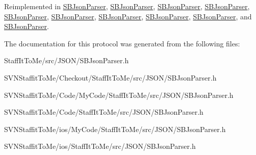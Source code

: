 \-Reimplemented in \hyperlink{interface_s_b_json_parser_a1ec40b986576044d58d30172b141c74c}{\-S\-B\-Json\-Parser}, \hyperlink{interface_s_b_json_parser_a1ec40b986576044d58d30172b141c74c}{\-S\-B\-Json\-Parser}, \hyperlink{interface_s_b_json_parser_a1ec40b986576044d58d30172b141c74c}{\-S\-B\-Json\-Parser}, \hyperlink{interface_s_b_json_parser_a1ec40b986576044d58d30172b141c74c}{\-S\-B\-Json\-Parser}, \hyperlink{interface_s_b_json_parser_a1ec40b986576044d58d30172b141c74c}{\-S\-B\-Json\-Parser}, \hyperlink{interface_s_b_json_parser_a1ec40b986576044d58d30172b141c74c}{\-S\-B\-Json\-Parser}, \hyperlink{interface_s_b_json_parser_a1ec40b986576044d58d30172b141c74c}{\-S\-B\-Json\-Parser}, \hyperlink{interface_s_b_json_parser_a1ec40b986576044d58d30172b141c74c}{\-S\-B\-Json\-Parser}, \hyperlink{interface_s_b_json_parser_a1ec40b986576044d58d30172b141c74c}{\-S\-B\-Json\-Parser}, and \hyperlink{interface_s_b_json_parser_a1ec40b986576044d58d30172b141c74c}{\-S\-B\-Json\-Parser}.



\-The documentation for this protocol was generated from the following files\-:\begin{DoxyCompactItemize}
\item 
\-Staff\-It\-To\-Me/src/\-J\-S\-O\-N/\-S\-B\-Json\-Parser.\-h\item 
\-S\-V\-N\-Staffit\-To\-Me/\-Checkout/\-Staff\-It\-To\-Me/src/\-J\-S\-O\-N/\-S\-B\-Json\-Parser.\-h\item 
\-S\-V\-N\-Staffit\-To\-Me/\-Code/\-My\-Code/\-Staff\-It\-To\-Me/src/\-J\-S\-O\-N/\-S\-B\-Json\-Parser.\-h\item 
\-S\-V\-N\-Staffit\-To\-Me/\-Code/\-Staff\-It\-To\-Me/src/\-J\-S\-O\-N/\-S\-B\-Json\-Parser.\-h\item 
\-S\-V\-N\-Staffit\-To\-Me/ios/\-My\-Code/\-Staff\-It\-To\-Me/src/\-J\-S\-O\-N/\-S\-B\-Json\-Parser.\-h\item 
\-S\-V\-N\-Staffit\-To\-Me/ios/\-Staff\-It\-To\-Me/src/\-J\-S\-O\-N/\-S\-B\-Json\-Parser.\-h\end{DoxyCompactItemize}
